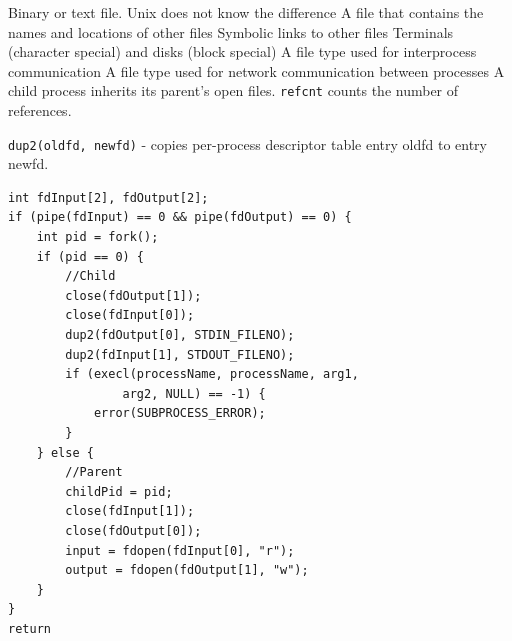 \documentclass[number]{notes}
\begin{document}
\begin{landscape}
\begin{multicols}{3}
Binary or text file. Unix does not know the difference
A file that contains the names and locations of other files
Symbolic links to other files
Terminals (character special) and disks (block special)
A file type used for interprocess communication
A file type used for network communication between processes
A child process inherits its parent's open files. \texttt{refcnt} counts the number of references.

\texttt{dup2(oldfd, newfd)} - copies per-process descriptor table entry oldfd to entry newfd.
\begin{minipage}{\linewidth}
\begin{lstlisting}
int fdInput[2], fdOutput[2];
if (pipe(fdInput) == 0 && pipe(fdOutput) == 0) {
    int pid = fork();
    if (pid == 0) {
        //Child
        close(fdOutput[1]);
        close(fdInput[0]);
        dup2(fdOutput[0], STDIN_FILENO);
        dup2(fdInput[1], STDOUT_FILENO);
        if (execl(processName, processName, arg1,
                arg2, NULL) == -1) {
            error(SUBPROCESS_ERROR);
        }
    } else {
        //Parent
        childPid = pid;
        close(fdInput[1]);
        close(fdOutput[0]);
        input = fdopen(fdInput[0], "r");
        output = fdopen(fdOutput[1], "w");
    }
}
return
\end{lstlisting}
\end{minipage}


\end{multicols}
\end{landscape}
\end{document}
